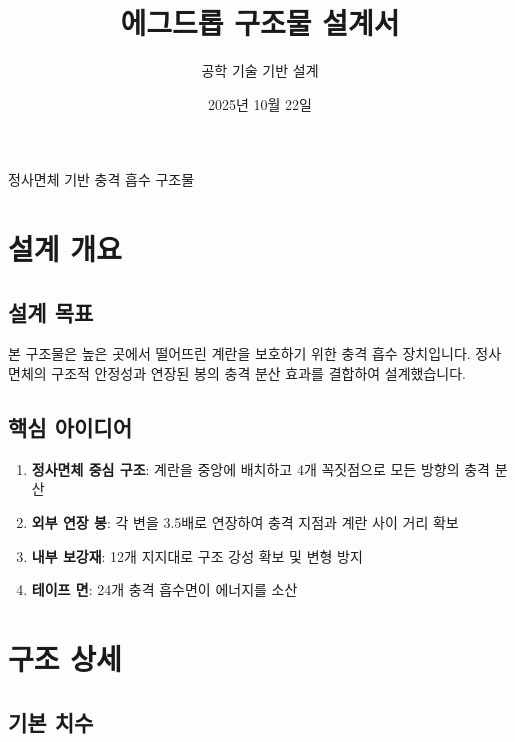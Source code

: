\documentclass[a4paper,12pt]{article}
\title{\Large\textbf{에그드롭 구조물 설계서}}
\author{공학 기술 기반 설계}
\date{2025년 10월 22일}
\begin{document}
\begin{CJK}{UTF8}{mj}

\maketitle

\begin{center}
\large
정사면체 기반 충격 흡수 구조물
\end{center}

\vspace{1cm}

\tableofcontents
\newpage

\section{설계 개요}

\subsection{설계 목표}

본 구조물은 높은 곳에서 떨어뜨린 계란을 보호하기 위한 충격 흡수 장치입니다. 
정사면체의 구조적 안정성과 연장된 봉의 충격 분산 효과를 결합하여 설계했습니다.

\subsection{핵심 아이디어}

\begin{enumerate}[leftmargin=*]
    \item \textbf{정사면체 중심 구조}: 계란을 중앙에 배치하고 4개 꼭짓점으로 모든 방향의 충격 분산
    \item \textbf{외부 연장 봉}: 각 변을 3.5배로 연장하여 충격 지점과 계란 사이 거리 확보
    \item \textbf{내부 보강재}: 12개 지지대로 구조 강성 확보 및 변형 방지
    \item \textbf{테이프 면}: 24개 충격 흡수면이 에너지를 소산
\end{enumerate}

\section{구조 상세}

\subsection{기본 치수}


\end{CJK}
\end{document}
